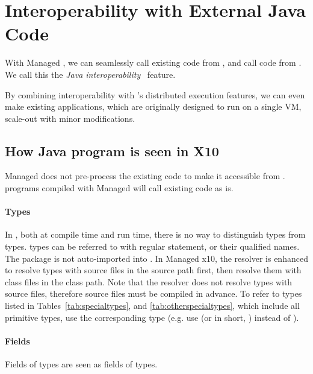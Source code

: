 \section{Interoperability with External Java Code}

With Managed \Xten{}, we can seamlessly call existing \Java{} code from \Xten{},
and call \Xten{} code from \Java{}.  We call this the 
\emph{Java interoperability}~\cite{TakeuchiX1013} feature.

By combining \Java{} interoperability with \Xten{}'s distributed
execution features, we can even make existing \Java{} applications, which
are originally designed to run on a single \Java{} VM, scale-out with
minor modifications.

\subsection{How Java program is seen in X10}

Managed \Xten{} does not pre-process the existing \Java{} code to make it
accessible from \Xten{}.  \Xten{} programs compiled with Managed \Xten{} will call
existing \Java{} code as is.

\paragraph{Types}

In \Xten{}, both at compile time and run time, there is no way to
distinguish \Java{} types from \Xten{} types.  \Java{} types can be referred to
with regular  statement, or their qualified names.  The
package  is not auto-imported into \Xten.  In Managed
x10, the resolver is enhanced to resolve types with \Xten{} source files
in the source path first, then resolve them with \Java{} class files in
the class path. Note that the resolver does not resolve types with
\Java{} source files, therefore \Java{} source files must be compiled in
advance.  To refer to \Java{} types listed in
Tables~\ref{tab:specialtypes}, and \ref{tab:otherspecialtypes}, which
include all \Java{} primitive types, use the corresponding \Xten{} type
(e.g. use  (or in short, ) instead of
).

\paragraph{Fields}

Fields of \Java{} types are seen as fields of \Xten{} types.

